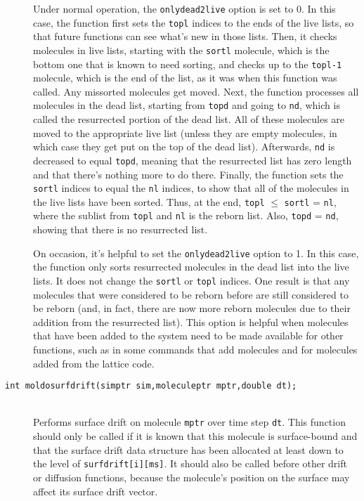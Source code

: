 \documentclass {scrbook}
\newcommand {\ttt} {\texttt}
\begin{document}
\begin{description}
Under normal operation, the \ttt{onlydead2live} option is set to 0. In this case, the function first sets the \ttt{topl} indices to the ends of the live lists, so that future functions can see what's new in those lists. Then, it checks molecules in live lists, starting with the \ttt{sortl} molecule, which is the bottom one that is known to need sorting, and checks up to the \ttt{topl-1} molecule, which is the end of the list, as it was when this function was called. Any missorted molecules get moved. Next, the function processes all molecules in the dead list, starting from \ttt{topd} and going to \ttt{nd}, which is called the resurrected portion of the dead list. All of these molecules are moved to the appropriate live list (unless they are empty molecules, in which case they get put on the top of the dead list). Afterwards, \ttt{nd} is decreased to equal \ttt{topd}, meaning that the resurrected list has zero length and that there's nothing more to do there. Finally, the function sets the \ttt{sortl} indices to equal the \ttt{nl} indices, to show that all of the molecules in the live lists have been sorted. Thus, at the end, \ttt{topl} $\leq$ \ttt{sortl} = \ttt{nl}, where the sublist from \ttt{topl} and \ttt{nl} is the reborn list. Also, \ttt{topd} = \ttt{nd}, showing that there is no resurrected list.

On occasion, it's helpful to set the \ttt{onlydead2live} option to 1. In this case, the function only sorts resurrected molecules in the dead list into the live lists. It does not change the \ttt{sortl} or \ttt{topl} indices. One result is that any molecules that were considered to be reborn before are still considered to be reborn (and, in fact, there are now more reborn molecules due to their addition from the resurrected list). This option is helpful when molecules that have been added to the system need to be made available for other functions, such as in some commands that add molecules and for molecules added from the lattice code.

\item[\ttt{int moldosurfdrift(simptr sim,moleculeptr mptr,double dt);}]
\hfill \\
Performs surface drift on molecule \ttt{mptr} over time step \ttt{dt}. This function should only be called if it is known that this molecule is surface-bound and that the surface drift data structure has been allocated at least down to the level of \ttt{surfdrift[i][ms]}. It should also be called before other drift or diffusion functions, because the molecule's position on the surface may affect its surface drift vector.


\end{description}
\end{document}
